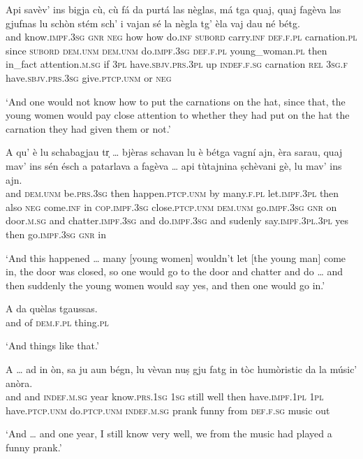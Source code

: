 \begin{linenumbers}
	\gll    Api savèv’ ins bigja cù, cù fá da purtá las nèglas, má tga quaj, quaj fagèva las gjufnas lu schòn stém sch’ i vajan sé la nègla tg’ èla vaj dau né bétg.\\
	and know.\textsc{impf.3sg} \textsc{gnr} \textsc{neg} how how do.\textsc{inf} \textsc{subord} carry.\textsc{inf} \textsc{def.f.pl} carnation.\textsc{pl} since \textsc{subord} \textsc{dem.unm} \textsc{dem.unm} do.\textsc{impf.3sg} \textsc{def.f.pl} young\_woman.\textsc{pl} then in\_fact attention.\textsc{m.sg} if \textsc{3pl}  have.\textsc{sbjv.prs.3pl} up \textsc{indef.f.sg} carnation \textsc{rel} \textsc{3sg.f} have.\textsc{sbjv.prs.3sg}  give.\textsc{ptcp.unm} or \textsc{neg} \\
\end{linenumbers}
\medskip
\glt `And one would not know how to put the carnations on the hat, since that, the young women would pay close attention to whether they had put on the hat the carnation they had given them or not.'
\medskip

\begin{linenumbers}
	\gll    A qu’ è lu schabagjau tr̩ … bjèras schavan lu è bétga vagní ajn, èra sarau, quaj mav’ ins sén ésch a patarlava a fagèva … api tùtajnina ṣchèvani gè, lu mav’ ins ajn.\\
	and \textsc{dem.unm} be.\textsc{prs.3sg} then happen.\textsc{ptcp.unm} by {} many.\textsc{f.pl}  let.\textsc{impf.3pl} then also \textsc{neg} come.\textsc{inf} in  \textsc{cop.impf.3sg} close.\textsc{ptcp.unm} \textsc{dem.unm} go.\textsc{impf.3sg} \textsc{gnr} on  door.\textsc{m.sg} and chatter.\textsc{impf.3sg} and do.\textsc{impf.3sg} {} and sudenly say.\textsc{impf.3pl.3pl} yes then  go.\textsc{impf.3sg} \textsc{gnr} in\\
\end{linenumbers}
\medskip
\glt `And this happened … many [young women] wouldn’t let [the young man] come in, the door was closed, so one would go to the door and chatter  and do … and then suddenly the young women would say yes, and then one would go in.'
\medskip

\begin{linenumbers}
	\gll    A da quèlas tgaussas.\\
	and of \textsc{dem.f.pl} thing.\textsc{pl}\\
\end{linenumbers}
\medskip
\glt `And things like that.'
\medskip

\begin{linenumbers}
	\gll    A … ad in òn, sa ju aun bégn, lu vèvan nuṣ gju fatg in tòc humòristic da la músic’ anòra.\\
	and {} and  \textsc{indef.m.sg} year know.\textsc{prs.1sg} \textsc{1sg} still well then have.\textsc{impf.1pl} \textsc{1pl} have.\textsc{ptcp.unm} do.\textsc{ptcp.unm} \textsc{indef.m.sg} prank funny from \textsc{def.f.sg} music out\\
\end{linenumbers}
\medskip
\glt `And … and one year, I still know very well, we from the music had played a funny prank.'
\medskip

